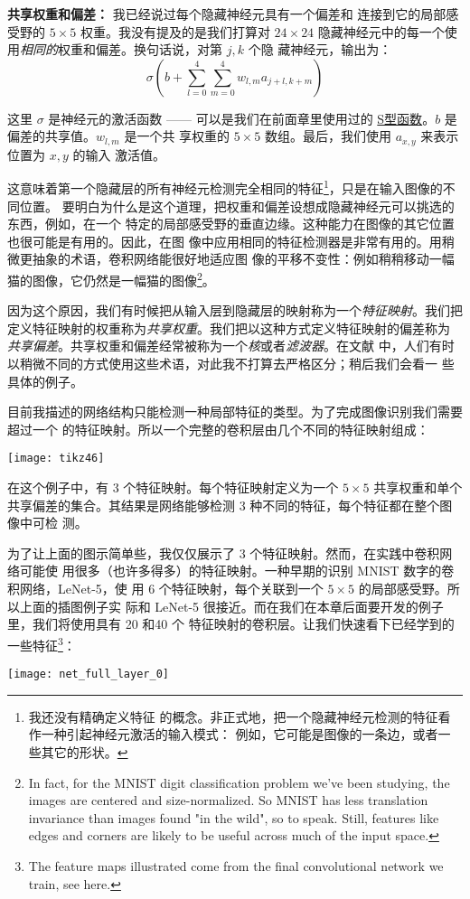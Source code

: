 \textbf{共享权重和偏差：} 我已经说过每个隐藏神经元具有一个偏差和
连接到它的局部感受野的 $5 \times 5$ 权重。我没有提及的是我们打算对 $24 \times
24$ 隐藏神经元中的每一个使用\emph{相同的}权重和偏差。换句话说，对第 $j, k$ 个隐
藏神经元，输出为：
\begin{equation}
  \sigma\left(b + \sum_{l=0}^4 \sum_{m=0}^4  w_{l,m} a_{j+l, k+m} \right)
  \label{eq:125}\tag{125}
\end{equation}

这里 $\sigma$ 是神经元的激活函数 —— 可以是我们在前面章里使用过的
\hyperref[sec:sigmoid_neurons]{S型函数}。$b$ 是偏差的共享值。$w_{l,m}$ 是一个共
享权重的 $5 \times 5$ 数组。最后，我们使用 $a_{x, y}$ 来表示位置为 $x, y$ 的输入
激活值。

这意味着第一个隐藏层的所有神经元检测完全相同的特征\footnote{我还没有精确定义特征
  的概念。非正式地，把一个隐藏神经元检测的特征看作一种引起神经元激活的输入模式：
  例如，它可能是图像的一条边，或者一些其它的形状。}，只是在输入图像的不同位置。
要明白为什么是这个道理，把权重和偏差设想成隐藏神经元可以挑选的东西，例如，在一个
特定的局部感受野的垂直边缘。这种能力在图像的其它位置也很可能是有用的。因此，在图
像中应用相同的特征检测器是非常有用的。用稍微更抽象的术语，卷积网络能很好地适应图
像的平移不变性：例如稍稍移动一幅猫的图像，它仍然是一幅猫的图像\footnote{In fact,
  for the MNIST digit classification problem we've been studying, the images are
  centered and size-normalized. So MNIST has less translation invariance than
  images found "in the wild", so to speak. Still, features like edges and
  corners are likely to be useful across much of the input space.}。

因为这个原因，我们有时候把从输入层到隐藏层的映射称为一个\emph{特征映射}。我们把
定义特征映射的权重称为\emph{共享权重}。我们把以这种方式定义特征映射的偏差称为
\emph{共享偏差}。共享权重和偏差经常被称为一个\emph{核}或者\emph{滤波器}。在文献
中，人们有时以稍微不同的方式使用这些术语，对此我不打算去严格区分；稍后我们会看一
些具体的例子。

目前我描述的网络结构只能检测一种局部特征的类型。为了完成图像识别我们需要超过一个
的特征映射。所以一个完整的卷积层由几个不同的特征映射组成：
\begin{center}
  \texttt{[image: tikz46]}
\end{center}

在这个例子中，有 3 个特征映射。每个特征映射定义为一个 $5 \times 5$ 共享权重和单个
共享偏差的集合。其结果是网络能够检测 3 种不同的特征，每个特征都在整个图像中可检
测。

为了让上面的图示简单些，我仅仅展示了 $3$ 个特征映射。然而，在实践中卷积网络可能使
用很多（也许多得多）的特征映射。一种早期的识别 MNIST 数字的卷积网络，LeNet-5，使
用 $6$ 个特征映射，每个关联到一个 $5 \times 5$ 的局部感受野。所以上面的插图例子实
际和 LeNet-5 很接近。而在我们在本章后面要开发的例子里，我们将使用具有 20 和40 个
特征映射的卷积层。让我们快速看下已经学到的一些特征\footnote{The feature maps
  illustrated come from the final convolutional network we train, see here.}：
\begin{center}
  \texttt{[image: net\_full\_layer\_0]}
\end{center}

